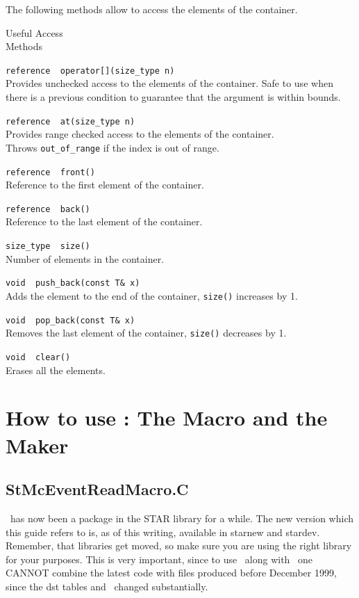 The following methods allow to access the elements of the container.

\begin{Entry}

\item[Useful Access \\Methods]

  \verb+reference  operator[](size_type n)+\\
  Provides unchecked access to the elements of the container.  Safe
  to use when there is a previous condition to guarantee that
  the argument is within bounds.

  \verb+reference  at(size_type n)+\\
  Provides range checked access to the elements of the container.\\
  Throws {\tt out\_of\_range} if the index is out of range.

  \verb+reference  front()+\\
   Reference to the first element of the container.
  
  \verb+reference  back()+\\
   Reference to the last element of the container.

  \verb+size_type  size()+\\
   Number of elements in the container.  

  \verb+void  push_back(const T& x)+\\
  Adds the element to the end of the container, {\tt size()} increases
  by 1.

  \verb+void  pop_back(const T& x)+\\
  Removes the last element of the container, {\tt size()} decreases
  by 1.

  \verb+void  clear()+\\
  Erases all the elements.

\end{Entry}



\section{How to use \StMcEvent: The Macro and the Maker}
\label{sec:howto}
\subsection{StMcEventReadMacro.C}
\StMcEvent\ has now been a package in the STAR library for a while.  The
new version which this guide refers to is, as of this writing,
available in starnew and stardev.  Remember, that libraries
get moved, so make sure you are using the right library for
your purposes.  This is very important, since to use \StMcEvent\
along with \StEvent\ one CANNOT combine the latest code with
files produced before December 1999, since the dst tables
and \StEvent\ changed substantially.

